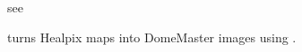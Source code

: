 %
\begin{related}
  \begin{sulist}{} %
  \item[{\ }] see 
  \item[\htmlref{hpx2dm}{idl:hpx2dm}] turns Healpix maps into DomeMaster images
using \thedocid.
  \end{sulist}
\end{related}




\newpage

